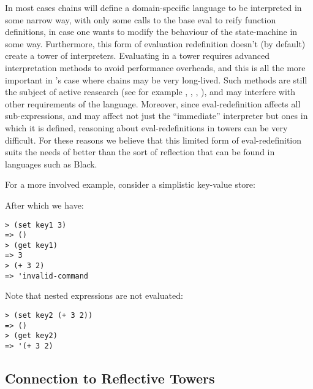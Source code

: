 In most cases chains will define a domain-specific language to be interpreted in
some narrow way, with only some calls to the base eval to reify function
definitions, in case one wants to modify the behaviour of the state-machine in
some way. Furthermore, this form of evaluation redefinition doesn't (by default)
create a tower of interpreters. Evaluating in a tower requires advanced
interpretation methods to avoid performance overheads, and this is all
the more important in \rad{}'s case where chains may be very long-lived. Such
methods are still the subject of active reasearch (see for example \cite{Asai2014},
\cite{Thyer1999}, \cite{Amin2017}, \cite{Brown2017}), and may interfere with other
requirements of the language. Moreover, since eval-redefinition affects all
sub-expressions, and may affect not just the ``immediate'' interpreter but ones
in which it is defined, reasoning about eval-redefinitions in towers can be
very difficult.
For these reasons we believe that this limited
form of eval-redefinition suits the needs of \rad{} better than the sort of
reflection that can be found in languages such as Black.




For a more involved example, consider a simplistic key-value store:

After which we have:
\bigskip
\begin{Verbatim}
> (set key1 3)
=> ()
> (get key1)
=> 3
> (+ 3 2)
=> 'invalid-command
\end{Verbatim}
Note that nested expressions are not evaluated:
\medskip
\begin{Verbatim}
> (set key2 (+ 3 2))
=> ()
> (get key2)
=> '(+ 3 2)
\end{Verbatim}

\subsection{Connection to Reflective Towers}
\label{s:reflective-towers}

